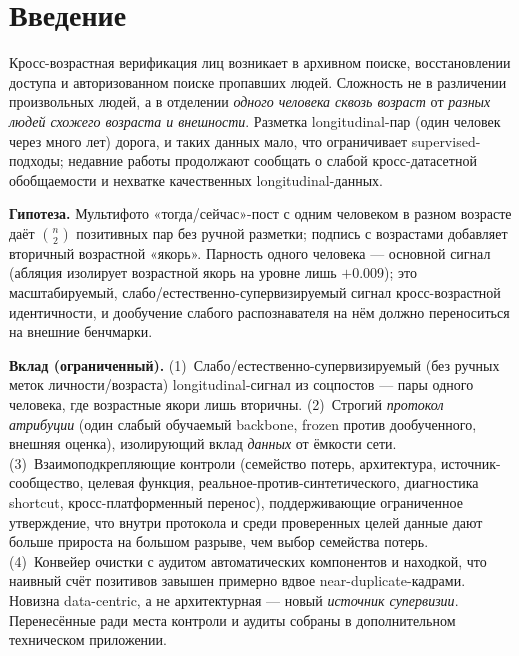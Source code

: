 \documentclass[10pt,twocolumn,letterpaper]{article}
\begin{document}
\section{Введение}\label{sec:intro}
Кросс-возрастная верификация лиц возникает в архивном поиске, восстановлении доступа и авторизованном
поиске пропавших людей. Сложность не в различении произвольных людей, а в отделении \emph{одного
человека сквозь возраст} от \emph{разных людей схожего возраста и внешности}. Разметка longitudinal-пар
(один человек через много лет) дорога, и таких данных мало, что ограничивает supervised-подходы;
недавние работы продолжают сообщать о слабой кросс-датасетной обобщаемости и нехватке качественных
longitudinal-данных.

\textbf{Гипотеза.} Мультифото «тогда/сейчас»-пост с одним человеком в разном возрасте даёт
$\binom{n}{2}$ позитивных пар без ручной разметки; подпись с возрастами добавляет вторичный возрастной
«якорь». Парность одного человека — основной сигнал (абляция изолирует возрастной якорь на уровне лишь
$+$0.009); это масштабируемый, слабо/естественно-супервизируемый сигнал кросс-возрастной идентичности,
и дообучение слабого распознавателя на нём должно переноситься на внешние бенчмарки.

\textbf{Вклад (ограниченный).}
(1)~Слабо/естественно-супервизируемый (без ручных меток личности/возраста) longitudinal-сигнал из
соцпостов — пары одного человека, где возрастные якори лишь вторичны.
(2)~Строгий \emph{протокол атрибуции} (один слабый обучаемый backbone, frozen против дообученного,
внешняя оценка), изолирующий вклад \emph{данных} от ёмкости сети.
(3)~Взаимоподкрепляющие контроли (семейство потерь, архитектура, источник-сообщество, целевая функция,
реальное-против-синтетического, диагностика shortcut, кросс-платформенный перенос), поддерживающие
ограниченное утверждение, что внутри протокола и среди проверенных целей данные дают больше прироста на
большом разрыве, чем выбор семейства потерь.
(4)~Конвейер очистки с аудитом автоматических компонентов и находкой, что наивный счёт позитивов
завышен примерно вдвое near-duplicate-кадрами.
Новизна data-centric, а не архитектурная — новый \emph{источник супервизии}. Перенесённые ради места
контроли и аудиты собраны в дополнительном техническом приложении.
\end{document}
